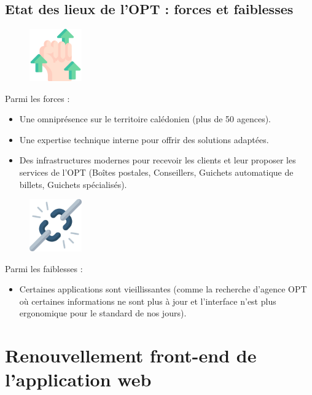 \documentclass[12pt,a4paper]{report}
\begin{document}
\section{Etat des lieux de l'OPT : forces et faiblesses}
\begin{figure}[h] %
    \centering
    \includegraphics[width=0.2\textwidth]{ressources_rapport/forces.png}
\end{figure}
Parmi les forces : 
\begin{itemize}
    \item Une omniprésence sur le territoire calédonien (plus de 50 agences).
    \item Une expertise technique interne pour offrir des solutions adaptées.
    \item Des infrastructures modernes pour recevoir les clients et leur proposer les services de l'OPT (Boîtes postales, Conseillers, Guichets automatique de billets, Guichets spécialisés).
\end{itemize}

\vspace{1cm}
\begin{figure}[h] %
    \centering
    \includegraphics[width=0.2\textwidth]{ressources_rapport/faiblesses.png}
\end{figure}
Parmi les faiblesses : 
\begin{itemize}
    \item Certaines applications sont vieillissantes (comme la recherche d'agence OPT où certaines informations ne sont plus à jour et l'interface n'est plus ergonomique pour le standard de nos jours).
\end{itemize}

\chapter{Renouvellement front-end de l'application web}
\end{document}
